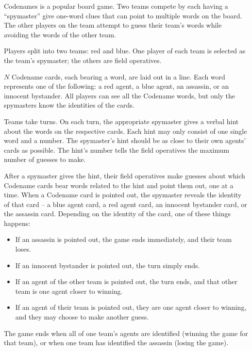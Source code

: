 \documentclass[11pt,letterpaper]{article}
\title{}
\author{}
\date{\today}
\begin{document}
\maketitle

Codenames is a popular board game. Two teams compete by each having a ``spymaster'' give one-word clues that can point to multiple words on the board. The other players on the team attempt to guess their team's words while avoiding the words of the other team.

Players split into two teams: red and blue. One player of each team is selected as the team's spymaster; the others are field operatives.

$N$ Codename cards, each bearing a word, are laid out in a line. Each word represents one of the following: a red agent, a blue agent, an assassin, or an innocent bystander. All players can see all the Codename words, but only the spymasters know the identities of the cards.

Teams take turns. On each turn, the appropriate spymaster gives a verbal hint about the words on the respective cards. Each hint may only consist of one single word and a number. The spymaster's hint should be as close to their own agents' cards as possible. The hint's number tells the field operatives the maximum number of guesses to make.

After a spymaster gives the hint, their field operatives make guesses about which Codename cards bear words related to the hint and point them out, one at a time. When a Codename card is pointed out, the spymaster reveals the identity of that card – a blue agent card, a red agent card, an innocent bystander card, or the assassin card. Depending on the identity of the card, one of these things happens:

\begin{itemize}
	\item If an assassin is pointed out, the game ends immediately, and their team loses.
	\item If an innocent bystander is pointed out, the turn simply ends.
	\item If an agent of the other team is pointed out, the turn ends, and that other team is one agent closer to winning.
	\item If an agent of their team is pointed out, they are one agent closer to winning, and they may choose to make another guess.
\end{itemize}

The game ends when all of one team's agents are identified (winning the game for that team), or when one team has identified the assassin (losing the game).
\end{document}
